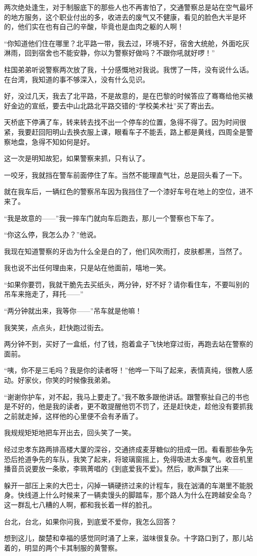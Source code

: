\par 两次绝处逢生，对于制服底下的那些人也不再害怕了，交通警察总是站在空气最坏的地方服务，这个职业付出的多，收进去的废气又不健康，看见的脸色大半是坏的，他们实在也有自己的辛酸，毕竟也是血肉之躯的人啊！
\par “你知道他们住在哪里？北平路一带，我去过，环境不好，宿舍大统舱，外面吃灰淋雨，回到宿舍也不能安静，你以为警察好做吗？不跟你吼就好啰！”
\par 柱国弟弟听说警察两次放了我，十分感慨地对我说。我愣了一阵，没有说什么话。在台湾，我知道的事不够深入，没有什么见识。
\par 好，没过几天，我去了北平路，不是故意的，是在巴黎的时候答应了骞骞给他买裱好金边的宣纸，要去中山北路北平路交错的“学校美术社”买了寄出去。
\par 天桥底下停满了车，转来转去找不出一个停车的位置，急得不得了。因为时间很紧，我要赶回阳明山去换衣服上课，眼看车子不能丢，路上都是黄线，四周全是警察地盘，急得不知如何是好。
\par 这一次是明知故犯，如果警察来抓，只有认了。
\par 一咬牙，我就挡在警车前面停住了车。当然不能理直气壮，总是回头看了一下。
\par 就在我车后，一辆红色的警察吊车因为我挡住了一个漆好车号在地上的空位，进不来了。
\par “我是故意的——”我一摔车门就向车后跑去，那儿一个警察也下车了。
\par “你这么停，我怎么办？”他说。
\par 我现在知道警察的牙齿为什么全是白的了，他们风吹雨打，皮肤都黑，当然了。
\par 我也说不出任何理由来，只是站在他面前，嘻地一笑。
\par “如果你要罚，我就干脆先去买纸头，两分钟，好不好？请你看住车，不要叫别的吊车来拖走了，拜托——”
\par “两分钟就出来，我等你——”吊车就是他嘛！
\par 我笑笑，点点头，赶快跑过街去。
\par 两分钟不到，买好了一盒纸，付了钱，抱着盒子飞快地穿过街，再跑去站在警察的面前。
\par “咦，你不是三毛吗？我是你的读者呀！”他哗一下叫了起来，表情真纯，很教人感动。好家伙，你笑的时候像我弟弟。
\par “谢谢你护车，对不起，我马上要走了。”我不敢多跟他讲话。跟警察扯自己的书也是不好的，他是我的读者，更不敢提醒他罚不罚了，还是赶快走，趁他没有要抓我之前就走掉，这样他的心里便不会有矛盾了。
\par 我规规矩矩地把车开出去，回头笑了一笑。
\par 经过忠孝东路两排高楼大厦的深谷，交通挤成麦芽糖似的扭成一团。看看那些争先恐后抢道争先的车队，我笑了起来，将玻璃窗摇上，免得吸进太多废气。收音机里播音员说要放一条歌，李珮菁唱的《到底爱我不爱》。然后，歌声飘了出来——
\par 躲开一部压上来的大巴士，闪掉一辆硬挤过来的计程车，我在汹涌的车潮里不能脱身。快线道上什么时候来了一辆卖馒头的脚踏车，那个路人为什么在跨越安全岛？这一群乱七八糟的人啊，都和我长着一样的脸孔。
\par 台北，台北，如果你问我，到底爱不爱你，我怎么回答？
\par 想到这儿，酸楚和幸福的感觉同时涌了上来，滋味很复杂。十字路口到了，那儿站着的，明显的两个卡其制服的黄警察。



